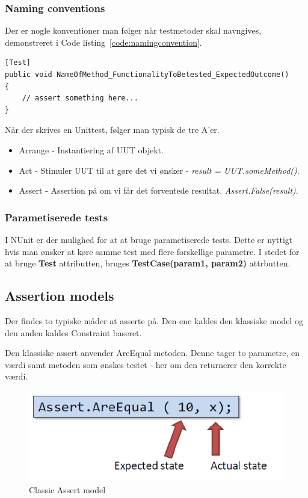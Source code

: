\subsubsection{Naming conventions}
Der er nogle konventioner man følger når testmetoder skal navngives, demonstreret i Code listing~\ref{code:namingconvention}.

\begin{lstlisting}[caption=Eksempel på navngivnings konvention for test.,label=code:namingconvention]
[Test]
public void NameOfMethod_FunctionalityToBetested_ExpectedOutcome()
{
	// assert something here...
}
\end{lstlisting}

Når der skrives en Unittest, følger man typisk de tre A'er.

\begin{itemize}
	\item Arrange - Instantiering af UUT objekt.
	\item Act - Stimuler UUT til at gøre det vi ønsker - \textit{result = UUT.someMethod()}.
	\item Assert - Assertion på om vi får det forventede resultat. \textit{Assert.False(result)}.
\end{itemize}

\subsubsection{Parametiserede tests}
I NUnit er der mulighed for at at bruge parametiserede tests. Dette er nyttigt hvis man ønsker at køre samme test med flere forskellige parametre. I stedet for at bruge \textbf{Test} attributten, bruges \textbf{TestCase(param1, param2)} attrbutten.


\subsection{Assertion models}
Der findes to typiske måder at asserte på. Den ene kaldes den klassiske model og den anden kaldes Constraint baseret.

Den klassiske assert anvender AreEqual metoden. Denne tager to parametre, en værdi samt metoden som ønskes testet - her om den returnerer den korrekte værdi.
\begin{figure}[H]
\centering
\includegraphics[width=0.45\linewidth]{figs/classicAssert.PNG}
\caption{Classic Assert model}
\label{fig:classicAssert}
\end{figure}


